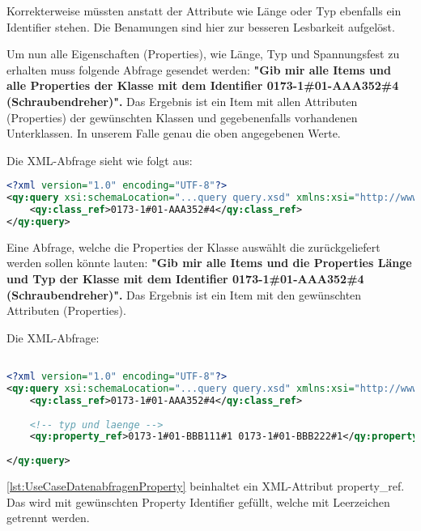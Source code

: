 Korrekterweise müssten anstatt der Attribute wie Länge oder Typ ebenfalls ein Identifier stehen. Die Benamungen sind hier zur besseren Lesbarkeit aufgelöst. 

Um nun alle Eigenschaften (Properties), wie Länge, Typ und Spannungsfest zu erhalten muss folgende Abfrage gesendet werden: 
\textbf{"Gib mir alle Items und alle Properties der Klasse mit dem Identifier 0173-1\#01-AAA352\#4 (Schraubendreher)".}
Das Ergebnis ist ein Item mit allen Attributen (Properties) der gewünschten Klassen und gegebenenfalls vorhandenen Unterklassen. In unserem Falle genau die oben angegebenen Werte.

Die XML-Abfrage sieht wie folgt aus:

\begin{lstlisting}[caption=Query Beispiel - Daten abfragen, language=XML, label=UseCaseDatenabfragen]
<?xml version="1.0" encoding="UTF-8"?>
<qy:query xsi:schemaLocation="...query query.xsd" xmlns:xsi="http://www.w3.org/2001/XMLSchema-instance" xmlns:cat="...catalogue" xmlns:val="...value" xmlns:qy="...query" xmlns:bas="...basic">
	<qy:class_ref>0173-1#01-AAA352#4</qy:class_ref>
</qy:query>
\end{lstlisting}

Eine Abfrage, welche die Properties der Klasse auswählt die zurückgeliefert werden sollen könnte lauten: 
\textbf{"Gib mir alle Items und die Properties Länge und Typ der Klasse mit dem Identifier 0173-1\#01-AAA352\#4 (Schraubendreher)".}
Das Ergebnis ist ein Item mit den gewünschten Attributen (Properties). 

Die XML-Abfrage:
\begin{lstlisting}[caption=Query Beispiel - Daten abfragen mit Propertyeinschränkung, language=XML, label=lst:UseCaseDatenabfragenProperty]

<?xml version="1.0" encoding="UTF-8"?>
<qy:query xsi:schemaLocation="...query query.xsd" xmlns:xsi="http://www.w3.org/2001/XMLSchema-instance" xmlns:cat="...catalogue" xmlns:val="...value" xmlns:qy="...query" xmlns:bas="...basic">
	<qy:class_ref>0173-1#01-AAA352#4</qy:class_ref>
	
	<!-- typ und laenge -->
	<qy:property_ref>0173-1#01-BBB111#1 0173-1#01-BBB222#1</qy:property_ref> 
	
</qy:query>
\end{lstlisting}

\autoref{lst:UseCaseDatenabfragenProperty} beinhaltet ein XML-Attribut property\_ref. Das wird mit gewünschten Property Identifier gefüllt, welche mit Leerzeichen getrennt werden. 

